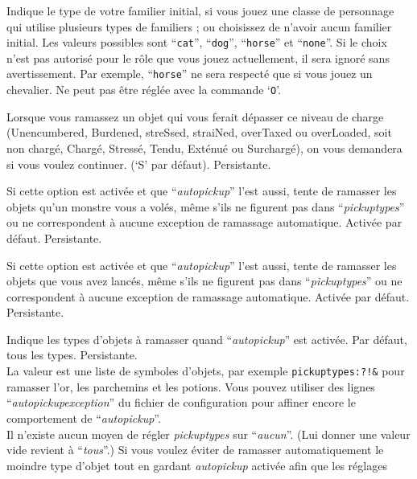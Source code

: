 \documentclass[titlepage]{article}
\begin{document}
\begin{description}[font=\mdseries\itshape]
\item[pettype]
Indique le type de votre familier initial, si vous jouez une classe de personnage
qui utilise plusieurs types de familiers ; ou choisissez de n'avoir aucun familier initial.
Les valeurs possibles sont ``\texttt{cat}'', ``\texttt{dog}'', ``\texttt{horse}''
et ``\texttt{none}''.
Si le choix n'est pas autorisé pour le rôle que vous jouez actuellement,
il sera ignoré sans avertissement. Par exemple, ``\texttt{horse}'' ne sera
respecté que si vous jouez un chevalier.
Ne peut pas être réglée avec la commande `\texttt{O}'.
\item[pickup\textunderscore burden]
Lorsque vous ramassez un objet qui vous ferait dépasser ce niveau
de charge (Unencumbered, Burdened, streSsed, straiNed, overTaxed
ou overLoaded, soit non chargé, Chargé, Stressé, Tendu, Exténué ou Surchargé),
on vous demandera si vous voulez continuer.
(`S' par défaut). Persistante.
\item[pickup\textunderscore stolen]
Si cette option est activée et que ``\textit{autopickup}'' l'est aussi, tente de ramasser
les objets qu'un monstre vous a volés, même s'ils ne figurent pas dans
``\textit{pickup\textunderscore types}'' ou
ne correspondent à aucune exception de ramassage automatique.
Activée par défaut.
Persistante.
\item[pickup\textunderscore thrown]
Si cette option est activée et que ``\textit{autopickup}'' l'est aussi, tente de ramasser
les objets que vous avez lancés, même s'ils ne figurent pas dans
``\textit{pickup\textunderscore types}'' ou
ne correspondent à aucune exception de ramassage automatique.
Activée par défaut.
Persistante.
\item[pickup\textunderscore types]
Indique les types d'objets à ramasser quand ``\textit{autopickup}''
est activée.
Par défaut, tous les types.
Persistante.
\\
La valeur est une liste de symboles d'objets, par exemple
\texttt{pickup\textunderscore types:\textdollar ?!\&} pour ramasser l'or, les parchemins et les potions.
Vous pouvez utiliser des lignes
``\textit{autopickup\textunderscore exception}''
du fichier de configuration pour affiner encore le comportement de ``\textit{autopickup}''.
\\
Il n'existe aucun moyen de régler \textit{pickup\textunderscore types} sur ``\textit{aucun}''.
(Lui donner une valeur vide revient à ``\textit{tous}''.)
Si vous voulez éviter de ramasser automatiquement le moindre type d'objet tout en
gardant \textit{autopickup} activée afin que les réglages

\end{description}
\end{document}
